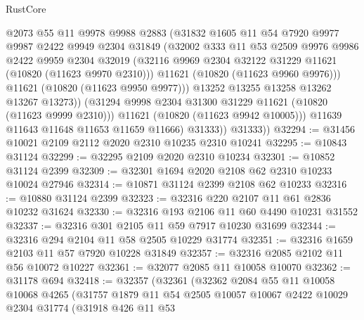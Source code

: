 \begin{lexlean}{RustCore}
\begin{coremodule}
                    @2073
                    @55
                    @11
                    @9978
                    @9988
                    @2883
                    (@31832
                      @1605
                      @11
                      @54
                      @7920
                      @9977
                      @9987
                      @2422
                      @9949
                      @2304
                      @31849
                      (@32002
                        @333
                        @11
                        @53
                        @2509
                        @9976
                        @9986
                        @2422
                        @9959
                        @2304
                        @32019
                        (@32116 @9969 @2304 @32122 @31229 @11621 (@10820 (@11623 @9970 @2310)))
                        @11621
                        (@10820 (@11623 @9960 @9976)))
                      @11621
                      (@10820 (@11623 @9950 @9977)))
                    @13252
                    @13255
                    @13258
                    @13262
                    @13267
                    @13273))
                (@31294 @9998 @2304 @31300 @31229 @11621 (@10820 (@11623 @9999 @2310)))
                @11621
                (@10820 (@11623 @9942 @10005)))
              @11639
              @11643
              @11648
              @11653
              @11659
              @11666)
            @31333))
        @31333))
@32294 := @31456 @10021 @2109 @2112 @2020 @2310 @10235 @2310 @10241
@32295 := @10843 @31124
@32299 := @32295 @2109 @2020 @2310 @10234
@32301 := @10852 @31124 @2399
@32309 := @32301 @1694 @2020 @2108 @62 @2310 @10233 @10024 @27946
@32314 := @10871 @31124 @2399 @2108 @62 @10233
@32316 := @10880 @31124 @2399
@32323 := @32316 @220 @2107 @11 @61 @2836 @10232 @31624
@32330 := @32316 @193 @2106 @11 @60 @4490 @10231 @31552
@32337 := @32316 @301 @2105 @11 @59 @7917 @10230 @31699
@32344 := @32316 @294 @2104 @11 @58 @2505 @10229 @31774
@32351 := @32316 @1659 @2103 @11 @57 @7920 @10228 @31849
@32357 := @32316 @2085 @2102 @11 @56 @10072 @10227
@32361 := @32077 @2085 @11 @10058 @10070
@32362 := @31178 @694
@32418 := @32357
    (@32361
      (@32362
        @2084
        @55
        @11
        @10058
        @10068
        @4265
        (@31757
          @1879
          @11
          @54
          @2505
          @10057
          @10067
          @2422
          @10029
          @2304
          @31774
          (@31918
            @426
            @11
            @53

\end{coremodule}
\end{lexlean}
